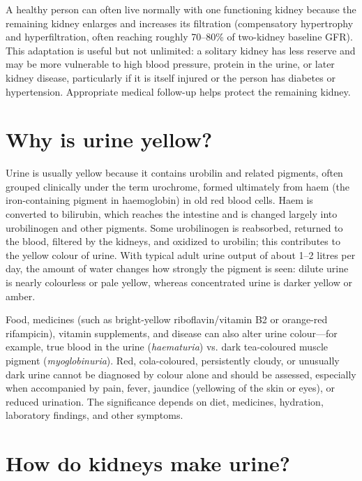 \documentclass[11pt,oneside]{report}
\begin{document}
A healthy person can often live normally with one functioning kidney because
the remaining kidney enlarges and increases its filtration (compensatory
hypertrophy and hyperfiltration, often reaching roughly 70--80\% of two-kidney
baseline GFR). This adaptation is useful but not unlimited:
a solitary kidney has less reserve and may be more vulnerable to high blood
pressure, protein in the urine, or later kidney disease, particularly if it is
itself injured or the person has diabetes or hypertension. Appropriate medical
follow-up helps protect the remaining kidney.

\section{Why is urine yellow?}

Urine is usually yellow because it contains urobilin and related pigments,
often grouped clinically under the term urochrome, formed
ultimately from haem (the iron-containing pigment in haemoglobin) in old red
blood cells. Haem is converted to bilirubin, which reaches the intestine and is
changed largely into urobilinogen and other pigments. Some urobilinogen is
reabsorbed, returned to the blood, filtered by the kidneys, and oxidized to
urobilin; this contributes to the yellow colour of urine. With typical adult
urine output of about 1--2 litres per day, the amount of water changes how
strongly the pigment is seen: dilute urine is nearly colourless or pale yellow,
whereas concentrated urine is darker yellow or amber.

Food, medicines (such as bright-yellow riboflavin/vitamin B2 or orange-red
rifampicin), vitamin supplements, and disease can also alter urine colour—for
example, true blood in the urine (\emph{haematuria}) vs. dark tea-coloured
muscle pigment (\emph{myoglobinuria}). Red, cola-coloured, persistently cloudy,
or unusually dark urine cannot be diagnosed by colour alone and should be
assessed, especially when accompanied by pain, fever, jaundice (yellowing of
the skin or eyes), or reduced urination. The significance depends on
diet, medicines, hydration, laboratory findings, and other symptoms.

\section{How do kidneys make urine?}
\end{document}

